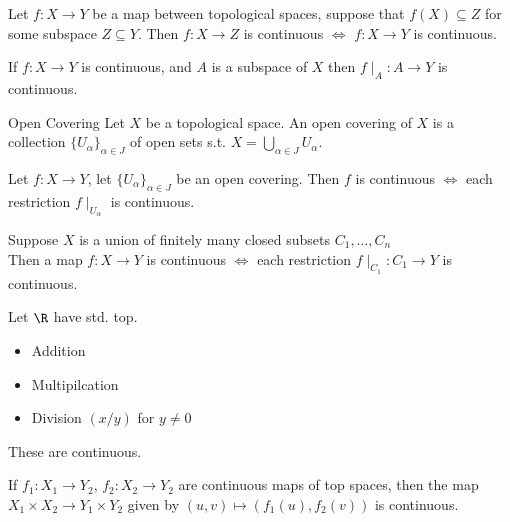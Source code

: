 
\begin{proposition}{}{}
    Let $f:X \to Y$ be a map between topological spaces, suppose that $f(X) \subseteq Z$ for some subspace $Z \subseteq Y$. Then $f: X \to Z$ is continuous $\iff$ $f: X \to Y$ is continuous.
\end{proposition}
\begin{proposition}{}{}
    If $f: X \to Y$ is continuous, and $A$ is a subspace of $X$ then $f\mid_A: A \to Y$ is continuous.
\end{proposition}
\begin{definition}{Open Covering}{}
    Let $X$ be a topological space. An open covering of $X$ is a collection $\{U_\alpha\}_{\alpha \in J}$ of open sets s.t. $X=\displaystyle\bigcup_{\alpha \in J}U_\alpha$.
\end{definition}
\begin{proposition}{}{}
    Let $f : X \to Y$, let $\{U_\alpha\}_{\alpha \in J}$ be an open covering. Then $f$ is continuous $\iff$ each restriction $f\mid_{U_\alpha}$ is continuous.
\end{proposition}
\begin{proposition}{}{}
    Suppose $X$ is a union of finitely many closed subsets $C_1,\dots,C_n$\\
    Then a map $f: X \to Y$ is continuous $\iff$ each restriction $f\mid_{C_1}: C_1 \to Y$ is continuous.
\end{proposition}
\noindent Let $\R$ have std. top.
\begin{itemize}
    \item Addition
    \item Multipilcation
    \item Division $(x/y)$ for $y \neq 0$
\end{itemize}
These are continuous.

\begin{lemma}{}{}
    If $f_1: X_1 \to Y_2$, $f_2: X_2 \to Y_2$ are continuous maps of top spaces, then the map $X_1 \times X_2 \to Y_1 \times Y_2$ given by $(u,v) \mapsto (f_1(u),f_2(v))$ is continuous.
\end{lemma}

